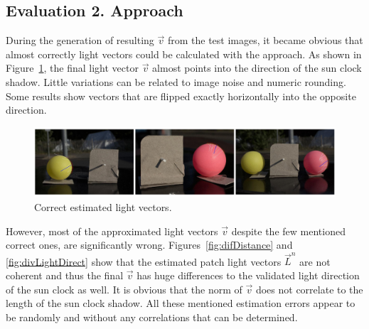 \subsection{Evaluation 2. Approach}
During the generation of resulting $\vec{v}$ from the test images, it became obvious that almost correctly light vectors could be calculated with the approach. As shown in Figure~\ref{fig:goodRes}, the final light vector $\vec{v}$ almost points into the direction of the sun clock shadow. Little variations can be related to image noise and numeric rounding. Some results show vectors that are flipped exactly horizontally into the opposite direction.
\begin{figure}[H] 
	\center 
	\includegraphics[width=\linewidth]{Images/Korrekte_Lightvectoren.jpg}	
	\caption[Bildunterschrift]{Correct estimated light vectors.}	
		\label{fig:goodRes}	
\end{figure}
However, most of the approximated light vectors $\vec{v}$ despite the few mentioned correct ones, are significantly wrong. Figures~\ref{fig:difDistance} and \ref{fig:divLightDirect} show that the estimated patch light vectors $\vec{L}^n$ are not coherent and thus the final $\vec{v}$ has huge differences to the validated light direction of the sun clock as well. It is obvious that the norm of $\vec{v}$ does not correlate to the length of the sun clock shadow. All these mentioned estimation errors appear to be randomly and without any correlations that can be determined. 

